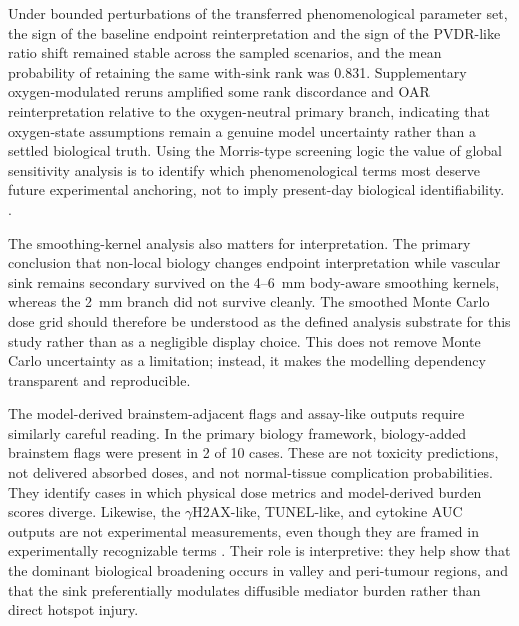 \documentclass[10pt,a4paper]{article}
\begin{document}
Under bounded perturbations of the transferred phenomenological parameter set, the sign of the baseline endpoint reinterpretation and the sign of the PVDR-like ratio shift remained stable across the sampled scenarios, and the mean probability of retaining the same with-sink rank was 0.831. Supplementary oxygen-modulated reruns amplified some rank discordance and OAR reinterpretation relative to the oxygen-neutral primary branch, indicating that oxygen-state assumptions remain a genuine model uncertainty rather than a settled biological truth. Using the Morris-type screening logic the value of global sensitivity analysis is to identify which phenomenological terms most deserve future experimental anchoring, not to imply present-day biological identifiability. \cite{morris1991factorial,herman2017salib}.

The smoothing-kernel analysis also matters for interpretation. The primary conclusion that non-local biology changes endpoint interpretation while vascular sink remains secondary survived on the 4--6~mm body-aware smoothing kernels, whereas the 2~mm branch did not survive cleanly. The smoothed Monte Carlo dose grid should therefore be understood as the defined analysis substrate for this study rather than as a negligible display choice. This does not remove Monte Carlo uncertainty as a limitation; instead, it makes the modelling dependency transparent and reproducible.

The model-derived brainstem-adjacent flags and assay-like outputs require similarly careful reading. In the primary biology framework, biology-added brainstem flags were present in 2 of 10 cases. These are not toxicity predictions, not delivered absorbed doses, and not normal-tissue complication probabilities. They identify cases in which physical dose metrics and model-derived burden scores diverge. Likewise, the $\gamma$H2AX-like, TUNEL-like, and cytokine AUC outputs are not experimental measurements, even though they are framed in experimentally recognizable terms \cite{rogakou1998h2ax,gavrieli1992tunel}. Their role is interpretive: they help show that the dominant biological broadening occurs in valley and peri-tumour regions, and that the sink preferentially modulates diffusible mediator burden rather than direct hotspot injury.
\end{document}
